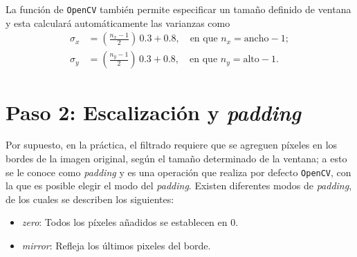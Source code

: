 La función de \texttt{\small OpenCV} también permite especificar un tamaño definido de ventana y esta calculará automáticamente las varianzas como
%
\begin{subequations}
    \label{eq:variance_from_kernel}
    \begin{align}
        \sigma_x &= \left(\frac{n_x - 1}{2}\right)\,0.3 + 0.8, \quad \text{en que } n_x = \text{ancho} - 1; \label{eq:variance_from_kernel_1} \\
        \sigma_y &= \left(\frac{n_y - 1}{2}\right)\,0.3 + 0.8, \quad \text{en que } n_y = \text{alto} - 1. \label{eq:variance_from_kernel_2}
    \end{align}
\end{subequations}

\section*{Paso 2: Escalización y \emph{padding}}
\label{sec:padding}
Por supuesto, en la práctica, el filtrado requiere que se agreguen píxeles en los bordes de la imagen original, según el tamaño determinado de la ventana;
a esto se le conoce como \emph{padding} y es una operación que realiza por defecto \texttt{\small OpenCV}, con la que es posible elegir el modo del \emph{padding}.
Existen diferentes modos de \emph{padding}, de los cuales se describen los siguientes:
%
\begin{itemize}
    \item \emph{zero}: Todos los píxeles añadidos se establecen en $0$.
    \item \emph{mirror}: Refleja los últimos pixeles del borde.
\end{itemize}

